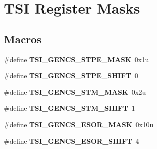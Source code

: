 \hypertarget{group___t_s_i___register___masks}{}\section{T\+S\+I Register Masks}
\label{group___t_s_i___register___masks}
\subsection*{Macros}
\begin{DoxyCompactItemize}
\item 
\hypertarget{group___t_s_i___register___masks_ga83a2e8e8965873c67507422e6e9a9b8e}{}\#define {\bfseries T\+S\+I\+\_\+\+G\+E\+N\+C\+S\+\_\+\+S\+T\+P\+E\+\_\+\+M\+A\+S\+K}~0x1u\label{group___t_s_i___register___masks_ga83a2e8e8965873c67507422e6e9a9b8e}

\item 
\hypertarget{group___t_s_i___register___masks_gab11b995ab664e22700a2f67aa2b1a070}{}\#define {\bfseries T\+S\+I\+\_\+\+G\+E\+N\+C\+S\+\_\+\+S\+T\+P\+E\+\_\+\+S\+H\+I\+F\+T}~0\label{group___t_s_i___register___masks_gab11b995ab664e22700a2f67aa2b1a070}

\item 
\hypertarget{group___t_s_i___register___masks_ga490fa9afb2591596712216cc7031cd47}{}\#define {\bfseries T\+S\+I\+\_\+\+G\+E\+N\+C\+S\+\_\+\+S\+T\+M\+\_\+\+M\+A\+S\+K}~0x2u\label{group___t_s_i___register___masks_ga490fa9afb2591596712216cc7031cd47}

\item 
\hypertarget{group___t_s_i___register___masks_ga4e08b4560fff0d44559e8dd48afcb4b0}{}\#define {\bfseries T\+S\+I\+\_\+\+G\+E\+N\+C\+S\+\_\+\+S\+T\+M\+\_\+\+S\+H\+I\+F\+T}~1\label{group___t_s_i___register___masks_ga4e08b4560fff0d44559e8dd48afcb4b0}

\item 
\hypertarget{group___t_s_i___register___masks_ga1036a1740b9fd85ac9a7ee8c7b31fbc5}{}\#define {\bfseries T\+S\+I\+\_\+\+G\+E\+N\+C\+S\+\_\+\+E\+S\+O\+R\+\_\+\+M\+A\+S\+K}~0x10u\label{group___t_s_i___register___masks_ga1036a1740b9fd85ac9a7ee8c7b31fbc5}

\item 
\hypertarget{group___t_s_i___register___masks_ga2cdb34b848a822afc459c74893200fbb}{}\#define {\bfseries T\+S\+I\+\_\+\+G\+E\+N\+C\+S\+\_\+\+E\+S\+O\+R\+\_\+\+S\+H\+I\+F\+T}~4\label{group___t_s_i___register___masks_ga2cdb34b848a822afc459c74893200fbb}


\end{DoxyCompactItemize}
